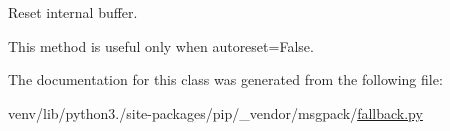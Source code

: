 \begin{DoxyVerb}Reset internal buffer.

This method is useful only when autoreset=False.
\end{DoxyVerb}
 

The documentation for this class was generated from the following file\+:\begin{DoxyCompactItemize}
\item 
venv/lib/python3./site-\/packages/pip/\+\_\+vendor/msgpack/\hyperlink{fallback_8py}{fallback.\+py}\end{DoxyCompactItemize}
